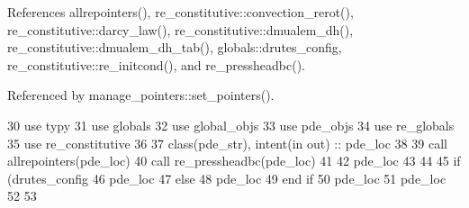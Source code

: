 References allrepointers(), re\+\_\+constitutive\+::convection\+\_\+rerot(), re\+\_\+constitutive\+::darcy\+\_\+law(), re\+\_\+constitutive\+::dmualem\+\_\+dh(), re\+\_\+constitutive\+::dmualem\+\_\+dh\+\_\+tab(), globals\+::drutes\+\_\+config, re\+\_\+constitutive\+::re\+\_\+initcond(), and re\+\_\+pressheadbc().



Referenced by manage\+\_\+pointers\+::set\+\_\+pointers().


\begin{DoxyCode}
30       \textcolor{keywordtype}{use }typy
31       \textcolor{keywordtype}{use }globals
32       \textcolor{keywordtype}{use }global_objs
33       \textcolor{keywordtype}{use }pde_objs
34       \textcolor{keywordtype}{use }re_globals
35       \textcolor{keywordtype}{use }re_constitutive
36       
37       \textcolor{keywordtype}{class}(pde_str), \textcolor{keywordtype}{intent(in out)} :: pde\_loc
38       
39       \textcolor{keyword}{call }allrepointers(pde\_loc)
40       \textcolor{keyword}{call }re_pressheadbc(pde\_loc)
41       
42       pde\_loc%
43 
44       
45       \textcolor{keywordflow}{if} (drutes_config%
46         pde\_loc%
47       \textcolor{keywordflow}{else}
48         pde\_loc%
49 \textcolor{keywordflow}{      end if}
50       pde\_loc%
51       pde\_loc%
52      
53     
\end{DoxyCode}



